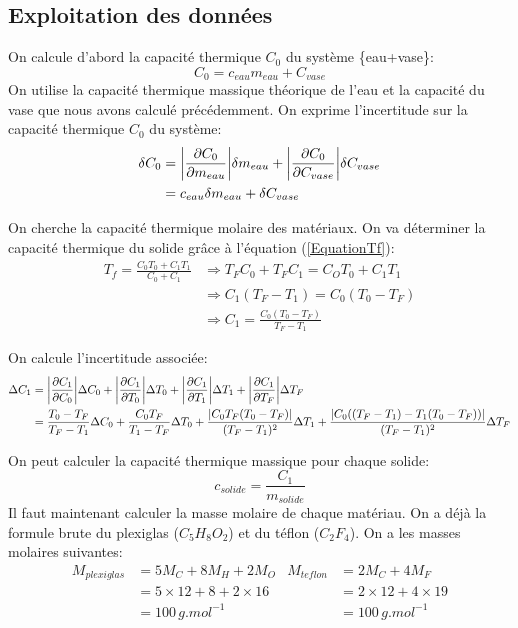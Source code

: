 \documentclass[12pt]{article}
\begin{document}
\subsection{Exploitation des données}
On calcule d'abord la capacité thermique $C_0$ du système \{eau+vase\}:
\begin{equation}
C_0=c_{eau}m_{eau}+C_{vase}
\end{equation}
On utilise la capacité thermique massique théorique de l'eau et la capacité du vase que nous avons calculé précédemment. On exprime l'incertitude sur la capacité thermique $C_0$ du système:
\begin{align*}
\delta C_0&= \abs{\frac{\partial C_0}{\partial m_{eau}}} \delta m_{eau} + \abs{\frac{\partial C_0}{\partial C_{vase}}} \delta C_{vase}\\
&=c_{eau}\delta m_{eau}+\delta C_{vase}
\end{align*}



On cherche la capacité thermique molaire des matériaux. On va déterminer la capacité thermique du solide grâce à l'équation (\ref{EquationTf}):
\begin{align*}
T_f=\frac{C_0T_0+C_1T_1}{C_0+C_1} &\Rightarrow T_FC_0+T_FC_1=C_OT_0+C_1T_1 \\
&\Rightarrow C_1(T_F-T_1)=C_0(T_0-T_F) \\
&\Rightarrow C_1=\frac{C_0(T_0-T_F)}{T_F-T_1}
\end{align*}

On calcule l'incertitude associée:
\begin{align*}
\Delta C_1 &= \abs{\frac{\partial C_1}{\partial C_0}} \Delta C_0 + \abs{\frac{\partial C_1}{\partial T_0}} \Delta T_0 + \abs{\frac{\partial C_1}{\partial T_1}} \Delta T_1 + \abs{\frac{\partial C_1}{\partial T_F}} \Delta T_F \\
&= \frac{T_0-T_F}{T_F-T_1}\Delta C_0 + \frac{C_0T_F}{T_1-T_F}\Delta T_0 + \frac{\abs{C_0T_F(T_0-T_F)}}{(T_F-T_1)^2}\Delta T_1 + \frac{\abs{C_0((T_F-T_1)-T_1(T_0-T_F))}}{(T_F-T_1)^2}\Delta T_F
\end{align*}




On peut calculer la capacité thermique massique pour chaque solide:
\begin{equation}
c_{solide}=\frac{C_1}{m_{solide}}
\end{equation}
Il faut maintenant calculer la masse molaire de chaque matériau. On a déjà la formule brute du plexiglas ($C_5H_8O_2$) et du téflon ($C_2F_4$). On a les masses molaires suivantes:
\begin{align*}
M_{plexiglas}&=5M_C+8M_H+2M_O & M_{teflon}&=2M_C+4M_F  \\
&=5\times 12+8+2\times 16 & &=2\times 12+4\times 19 \\
&=100\, g.mol^{-1} & &=100\, g.mol^{-1}
\end{align*}
\end{document}
